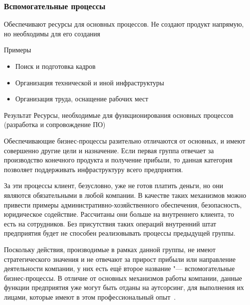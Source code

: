 \documentclass{../industrial-development}
\begin{document}
\begin{frame} \frametitle{Вспомогательные процессы}
	\begin{block}{}
		Обеспечивают ресурсы для основных процессов. Не создают продукт напрямую, но необходимы для его создания
	\end{block}
	\begin{block}{Примеры}
		\begin{itemize}
			\item Поиск и подготовка кадров
			\item Организация технической и иной инфраструктуры
			\item Организация труда, оснащение рабочих мест
		\end{itemize}
	\end{block}
	\begin{block}{Результат}
		Ресурсы, необходимые для функционирования основных процессов (разработка и сопровождение ПО)
	\end{block}
\end{frame}

\lecturenotes

Обеспечивающие бизнес-процессы разительно отличаются от основных, и имеют совершенно другие цели и назначение. Если первая группа отвечает за производство конечного продукта и получение прибыли, то данная категория позволяет поддерживать инфраструктуру всего предприятия.

За эти процессы клиент, безусловно, уже не готов платить деньги, но они являются обязательными в любой компании. В качестве таких механизмов можно привести примеры административно-хозяйственного обеспечения, безопасность, юридическое содействие. Рассчитаны они больше на внутреннего клиента, то есть на сотрудников. Без присутствия таких операций внутренний штат предприятия будет не способен реализовывать процессы предыдущей группы.

Поскольку действия, производимые в рамках данной группы, не имеют стратегического значения и не отвечают за прирост прибыли или направление деятельности компании, у них есть ещё второе название "--- вспомогательные бизнес-процессы. В отличие от основных механизмов работы компании, данные функции предприятия уже могут быть отданы на аутсорсинг, для выполнения их лицами, которые имеют в этом профессиональный опыт~\cite{Vseproip}.
\end{document}
